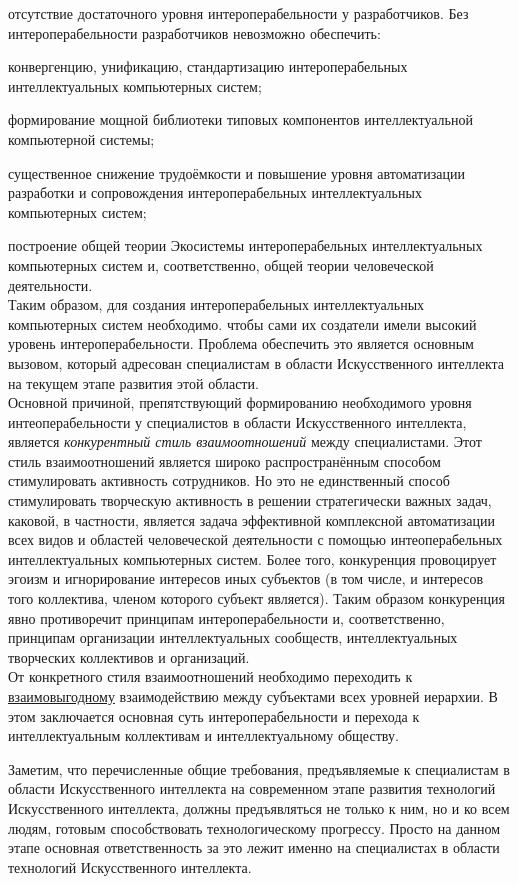 \begin{textitemize}
\begin{textitemize}
	\end{textitemize}
	\item отсутствие достаточного уровня интероперабельности у разработчиков. Без интероперабельности разработчиков невозможно обеспечить:
	\begin{textitemize}
		\item конвергенцию, унификацию, стандартизацию интероперабельных интеллектуальных компьютерных систем;
		\item формирование мощной библиотеки типовых компонентов интеллектуальной компьютерной системы;
		\item существенное снижение трудоёмкости и повышение уровня автоматизации разработки и сопровождения интероперабельных интеллектуальных компьютерных систем;
		\item построение общей теории Экосистемы интероперабельных интеллектуальных компьютерных систем и, соответственно, общей теории человеческой деятельности.\\
		Таким образом, для создания интероперабельных интеллектуальных компьютерных систем необходимо. чтобы сами их создатели имели высокий уровень интероперабельности. Проблема обеспечить это является основным вызовом, который адресован специалистам в области Искусственного интеллекта на текущем этапе развития этой области.\\
		Основной причиной, препятствующий формированию необходимого уровня интеоперабельности у специалистов в области Искусственного интеллекта, является \textit{конкурентный стиль взаимоотношений} между специалистами. Этот стиль взаимоотношений является широко распространённым способом стимулировать активность сотрудников. Но это не единственный способ стимулировать творческую активность в решении стратегически важных задач, каковой, в частности, является задача эффективной комплексной автоматизации всех видов и областей человеческой деятельности с помощью интеоперабельных интеллектуальных компьютерных систем. Более того, конкуренция провоцирует эгоизм и игнорирование интересов иных субъектов (в том числе, и интересов того коллектива, членом которого субъект является). Таким образом конкуренция явно противоречит принципам интероперабельности и, соответственно, принципам организации интеллектуальных сообществ, интеллектуальных творческих коллективов и организаций.\\
		От конкретного стиля взаимоотношений необходимо переходить к \uline{взаимовыгодному} взаимодействию между субъектами всех уровней иерархии. В этом заключается основная суть интероперабельности и перехода к интеллектуальным коллективам и интеллектуальному обществу.
	\end{textitemize}
	Заметим, что перечисленные общие требования, предъявляемые к специалистам в области Искусственного интеллекта на современном этапе развития технологий Искусственного интеллекта, должны предъявляться не только к ним, но и ко всем людям, готовым способствовать технологическому прогрессу. Просто на данном этапе основная ответственность за это лежит именно на специалистах в области технологий Искусственного интеллекта.
\end{textitemize}


